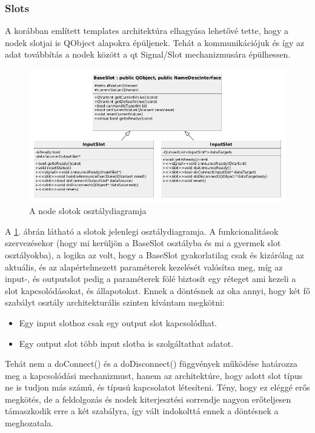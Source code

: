 \documentclass[a4paper,12pt,oneside]{report}
\begin{document}
\subsubsection{Slots}
A korábban említett templates architektúra elhagyása lehetővé tette, hogy a nodek slotjai is QObject alapokra épüljenek. Tehát a kommunikációjuk és így az adat továbbítás a nodek között a qt Signal/Slot mechanizmusára épülhessen.
\begin{center}
\begin{figure}[h]
  \includegraphics[width=1.1\textwidth]{slot_diag.png}
  \caption{A node slotok osztálydiagramja }

  \label{fig:bimg_slot_diag}
\end{figure}
\end{center}
A \ref{fig:bimg_slot_diag}. ábrán látható a slotok jelenlegi osztálydiagramja. A funkcionalitások szervezésekor (hogy mi kerüljön a BaseSlot osztályba és mi a gyermek slot osztályokba), a logika az volt, hogy a BaseSlot gyakorlatilag csak és kizárólag az aktuális, és az alapértelmezett paraméterek kezelését valósítsa meg, míg az input-, és outputslot pedig a paraméterek fölé biztosít egy réteget ami kezeli a slot kapcsolódásokat, és állapotokat. Ennek a döntésnek az oka annyi, hogy két fő szabályt osztály architekturális szinten kívántam megkötni:
\begin{itemize}
	\itemsep0em
	\item Egy input slothoz csak egy output slot kapcsolódhat.
	\item Egy output slot több input slotba is szolgáltathat adatot.
\end{itemize}
Tehát nem a doConnect() és a doDisconnect() függvények működése határozza meg a kapcsolódási mechanizmust, hanem az architektúre, hogy adott slot típus ne is tudjon más számú, és típusú kapcsolatot létesíteni. Tény, hogy ez eléggé erős megkötés, de a feldolgozás és nodek kiterjesztési sorrendje nagyon erőteljesen támaszkodik erre a két szabályra, így vált indokolttá ennek a döntésnek a meghozatala.
\end{document}
